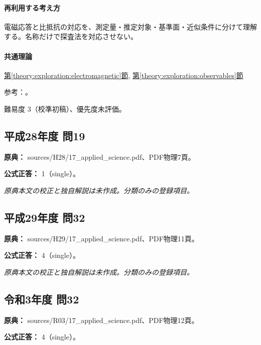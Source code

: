 \paragraph{再利用する考え方} 電磁応答と比抵抗の対応を、測定量・推定対象・基準面・近似条件に分けて理解する。名称だけで探査法を対応させない。

\paragraph{共通理論} \hyperref[theory:exploration:electromagnetic]{第\ref*{theory:exploration:electromagnetic}節}, \hyperref[theory:exploration:observables]{第\ref*{theory:exploration:observables}節}

\par 参考：\cite{ochi_csamt_saijo,gsi_gravity_definitions}。

\par 難易度 3（校準初稿）、優先度未評価。

\subsection{平成28年度 問19}
\label{q:h28-reg-applied-19}

\noindent\textbf{原典：} sources/H28/17\_applied\_science.pdf、PDF物理7頁。

\textbf{公式正答：} 1（single）。

\par\textit{原典本文の校正と独自解説は未作成。分類のみの登録項目。}

\subsection{平成29年度 問32}
\label{q:h29-reg-applied-32}

\noindent\textbf{原典：} sources/H29/17\_applied\_science.pdf、PDF物理11頁。

\textbf{公式正答：} 4（single）。

\par\textit{原典本文の校正と独自解説は未作成。分類のみの登録項目。}

\subsection{令和3年度 問32}
\label{q:r03-reg-applied-32}

\noindent\textbf{原典：} sources/R03/17\_applied\_science.pdf、PDF物理12頁。

\textbf{公式正答：} 4（single）。

